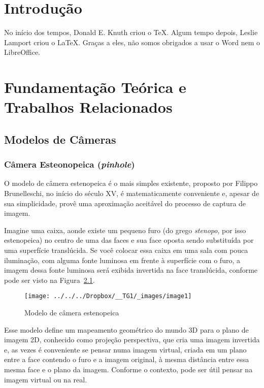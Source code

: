 \documentclass[ecp,tc]{iiufrgs}
\begin{document}
\tableofcontents


\chapter{Introdução}
No início dos tempos, Donald E. Knuth criou o \TeX. Algum tempo depois, Leslie Lamport criou o \LaTeX. Graças a eles, não somos obrigados a usar o Word nem o LibreOffice.

\chapter{Fundamentação Teórica e Trabalhos Relacionados}

\section{Modelos de Câmeras}

\subsection{Câmera Esteonopeica (\textit{pinhole})}
O  modelo  de  câmera  estenopeica  é  o  mais  simples  existente,  proposto  por  Filippo Brunelleschi, no início do século XV, é matematicamente conveniente e, apesar de sua simplicidade, provê uma aproximação aceitável do processo de captura de imagem.

Imagine uma caixa, aonde existe um pequeno furo (do grego \textit{stenopo}, por isso estenopeica) no centro de uma das faces e sua face oposta sendo substituída por uma superfície translúcida. Se você colocar essa caixa em uma sala com pouca iluminação, com alguma fonte luminosa em frente à superfície com o furo, a imagem dessa fonte luminosa será exibida invertida na face translúcida, conforme pode ser visto na Figura~\ref{fig:image1}.

\begin{figure}
\centering
\caption{Modelo de câmera estenopeica}
\texttt{[image: ../../../Dropbox/\_\_TG1/\_images/image1]}
\label{fig:image1}
\end{figure}

Esse modelo define um mapeamento geométrico do mundo 3D para o plano de imagem 2D, conhecido como projeção perspectiva, que cria uma imagem invertida e, as vezes é conveniente se pensar numa imagem virtual, criada em um plano entre a face contendo o furo e a imagem original, à mesma distância entre essa mesma face e o plano da imagem. Conforme o contexto, pode ser útil pensar na imagem virtual ou na real.
\end{document}
